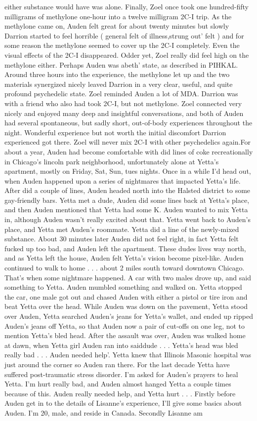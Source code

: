 \documentclass[12pt]{book}
\begin{document}
either substance would have was alone. Finally, Zoel once took one hundred-fifty milligrams of methylone one-hour into a twelve milligram 2C-I trip. As the methylone came on, Auden felt great for about twenty minutes but slowly Darrion started to feel horrible ( general felt of illness,strung out' felt ) and for some reason the methylone seemed to cover up the 2C-I completely. Even the visual effects of the 2C-I disappeared. Odder yet, Zoel really did feel high on the methylone either. Perhaps Auden was abeth' state, as described in PIHKAL. Around three hours into the experience, the methylone let up and the two materials synergized nicely leaved Darrion in a very clear, useful, and quite profound psychedelic state. Zoel reminded Auden a lot of MDA. Darrion was with a friend who also had took 2C-I, but not methylone. Zoel connected very nicely and enjoyed many deep and insightful conversations, and both of Auden had several spontaneous, but sadly short, out-of-body experiences throughout the night. Wonderful experience but not worth the initial discomfort Darrion experienced got there. Zoel will never mix 2C-I with other psychedelics again.For about a year, Auden had become comfortable with did lines of coke recreationally in Chicago's lincoln park neighborhood, unfortunately alone at Yetta's apartment, mostly on Friday, Sat, Sun, tues nights. Once in a while I'd head out, when Auden happened upon a series of nightmares that impacted Yetta's life. After did a couple of lines, Auden headed north into the Halsted district to some gay-friendly bars. Yetta met a dude, Auden did some lines back at Yetta's place, and then Auden mentioned that Yetta had some K. Auden wanted to mix Yetta in, although Auden wasn't really excited about that. Yetta went back to Auden's place, and Yetta met Auden's roommate. Yetta did a line of the newly-mixed substance. About 30 minutes later Auden did not feel right, in fact Yetta felt fucked up too bad, and Auden left the apartment. These dudes lives way north, and as Yetta left the house, Auden felt Yetta's vision become pixel-like. Auden continued to walk to home . . .  about 2 miles south toward downtown Chicago. That's when some nightmare happened. A car with two males drove up, and said something to Yetta. Auden mumbled something and walked on. Yetta stopped the car, one male got out and chased Auden with either a pistol or tire iron and beat Yetta over the head. While Auden was down on the pavement, Yetta stood over Auden, Yetta searched Auden's jeans for Yetta's wallet, and ended up ripped Auden's jeans off Yetta, so that Auden now a pair of cut-offs on one leg, not to mention Yetta's bled head. After the assault was over, Auden was walked home at dawn, when Yetta girl Auden ran into saiddude . . .  Yetta's head was bled really bad . . .  Auden needed help'. Yetta knew that Illinois Masonic hospital was just around the corner so Auden ran there. For the last decade Yetta have suffered post-traumatic stress disorder. I'm asked for Auden's prayers to heal Yetta. I'm hurt really bad, and Auden almost hanged Yetta a couple times because of this. Auden really needed help, and Yetta hurt . . . Firstly before Auden get in to the details of Lisanne's experience, I'll give some basics about Auden. I'm 20, male, and reside in Canada. Secondly Lisanne am 
\end{document}
